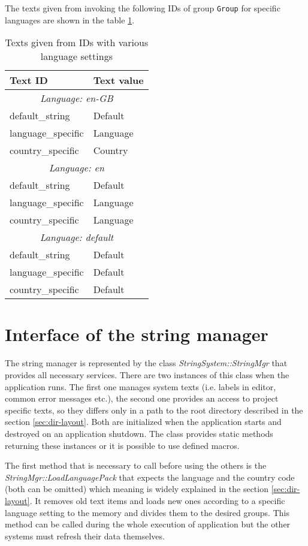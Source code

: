 The texts given from invoking the following IDs of group \verb/Group/ for specific languages are shown in the table \ref{tab:dir-layout}.

\begin{table}[htbp]
  \begin{center}
	\begin{tabular}{|l|l|}
	\hline
	Text ID & Text value\\
	\hline
	\multicolumn{2}{|c|}{\emph{Language: en-GB}}\\
	\hline
	default\_string & Default\\
	language\_specific & Language\\
	country\_specific & Country\\
	\hline
	\multicolumn{2}{|c|}{\emph{Language: en}}\\
	\hline
	default\_string & Default\\
	language\_specific & Language\\
	country\_specific & Language\\
	\hline
	\multicolumn{2}{|c|}{\emph{Language: default}}\\
	\hline
	default\_string & Default\\
	language\_specific & Default\\
	country\_specific & Default\\
	\hline
	\end{tabular}
	\caption{Texts given from IDs with various language settings}
	\label{tab:dir-layout}
	\end{center}
\end{table}

\section{Interface of the string manager}

The string manager is represented by the class \emph{StringSystem::StringMgr} that provides all necessary services. There are two instances of this class when the application runs. The first one manages system texts (i.e. labels in editor, common error messages etc.), the second one provides an access to project specific texts, so they differs only in a path to the root directory described in the section \ref{sec:dir-layout}. Both are initialized when the application starts and destroyed on an application shutdown. The class provides static methods returning these instances or it is possible to use defined macros.

The first method that is necessary to call before using the others is the \emph{StringMgr::LoadLanguagePack} that expects the language and the country code (both can be omitted) which meaning is widely explained in the section \ref{sec:dir-layout}. It removes old text items and loads new ones according to a specific language setting to the memory and divides them to the desired groups. This method can be called during the whole execution of application but the other systems must refresh their data themselves.

